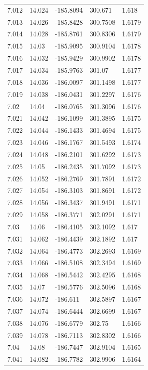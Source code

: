\begin{tabular}{lllll}
7.012 & 14.024 & -185.8094 & 300.671 & 1.618 \\
7.013 & 14.026 & -185.8428 & 300.7508 & 1.6179 \\
7.014 & 14.028 & -185.8761 & 300.8306 & 1.6179 \\
7.015 & 14.03 & -185.9095 & 300.9104 & 1.6178 \\
7.016 & 14.032 & -185.9429 & 300.9902 & 1.6178 \\
7.017 & 14.034 & -185.9763 & 301.07 & 1.6177 \\
7.018 & 14.036 & -186.0097 & 301.1498 & 1.6177 \\
7.019 & 14.038 & -186.0431 & 301.2297 & 1.6176 \\
7.02 & 14.04 & -186.0765 & 301.3096 & 1.6176 \\
7.021 & 14.042 & -186.1099 & 301.3895 & 1.6175 \\
7.022 & 14.044 & -186.1433 & 301.4694 & 1.6175 \\
7.023 & 14.046 & -186.1767 & 301.5493 & 1.6174 \\
7.024 & 14.048 & -186.2101 & 301.6292 & 1.6173 \\
7.025 & 14.05 & -186.2435 & 301.7092 & 1.6173 \\
7.026 & 14.052 & -186.2769 & 301.7891 & 1.6172 \\
7.027 & 14.054 & -186.3103 & 301.8691 & 1.6172 \\
7.028 & 14.056 & -186.3437 & 301.9491 & 1.6171 \\
7.029 & 14.058 & -186.3771 & 302.0291 & 1.6171 \\
7.03 & 14.06 & -186.4105 & 302.1092 & 1.617 \\
7.031 & 14.062 & -186.4439 & 302.1892 & 1.617 \\
7.032 & 14.064 & -186.4773 & 302.2693 & 1.6169 \\
7.033 & 14.066 & -186.5108 & 302.3494 & 1.6169 \\
7.034 & 14.068 & -186.5442 & 302.4295 & 1.6168 \\
7.035 & 14.07 & -186.5776 & 302.5096 & 1.6168 \\
7.036 & 14.072 & -186.611 & 302.5897 & 1.6167 \\
7.037 & 14.074 & -186.6444 & 302.6699 & 1.6167 \\
7.038 & 14.076 & -186.6779 & 302.75 & 1.6166 \\
7.039 & 14.078 & -186.7113 & 302.8302 & 1.6166 \\
7.04 & 14.08 & -186.7447 & 302.9104 & 1.6165 \\
7.041 & 14.082 & -186.7782 & 302.9906 & 1.6164 \\

\end{tabular}
